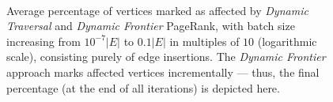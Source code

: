 \begin{figure}[!hbt]
  \centering
   \\[-2ex]
\caption{Average percentage of vertices marked as affected by \textit{Dynamic Traversal} and \textit{Dynamic Frontier} PageRank, with batch size increasing from $10^{-7} |E|$ to $0.1 |E|$ in multiples of $10$ (logarithmic scale), consisting purely of edge insertions. The \textit{Dynamic Frontier} approach marks affected vertices incrementally --- thus, the final percentage (at the end of all iterations) is depicted here.}
  \label{fig:measure-affected}
\end{figure}
